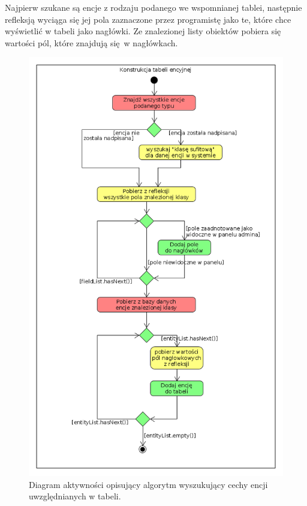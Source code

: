 Najpierw szukane są encje z rodzaju podanego we wspomnianej tablei, następnie refleksją wyciąga się jej pola zaznaczone przez programistę jako te, które chce wyświetlić w tabeli jako nagłówki. Ze znalezionej listy obiektów pobiera się wartości pól, które znajdują się w nagłówkach.
\begin{figure}
	\begin{center}
		\includegraphics[scale=0.5]{konsTabEnc.png}
	\end{center}
	\caption{{\color{black}Diagram aktywności opisujący algorytm wyszukujący cechy encji uwzględnianych w tabeli.}} \label{konsTabEnc}
\end{figure}

